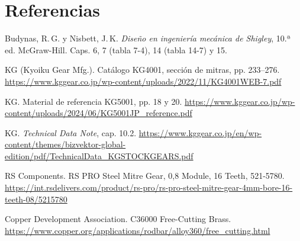 \documentclass[11pt,a4paper]{article}
\begin{document}
\section*{Referencias}
\begin{enumerate}[label={[\arabic*]},leftmargin=2em]
\item Budynas, R.\,G. y Nisbett, J.\,K. \textit{Diseño en ingeniería mecánica de Shigley}, 10.ª ed. McGraw-Hill. Caps. 6, 7 (tabla 7-4), 14 (tabla 14-7) y 15.
\item KG (Kyoiku Gear Mfg.). Catálogo KG4001, sección de mitras, pp. 233--276. \url{https://www.kggear.co.jp/wp-content/uploads/2022/11/KG4001WEB-7.pdf}
\item KG. Material de referencia KG5001, pp. 18 y 20. \url{https://www.kggear.co.jp/wp-content/uploads/2024/06/KG5001JP_reference.pdf}
\item KG. \textit{Technical Data Note}, cap. 10.2. \url{https://www.kggear.co.jp/en/wp-content/themes/bizvektor-global-edition/pdf/TechnicalData_KGSTOCKGEARS.pdf}
\item RS Components. RS PRO Steel Mitre Gear, 0,8 Module, 16 Teeth, 521-5780. \url{https://int.rsdelivers.com/product/rs-pro/rs-pro-steel-mitre-gear-4mm-bore-16-teeth-08/5215780}
\item Copper Development Association. C36000 Free-Cutting Brass. \url{https://www.copper.org/applications/rodbar/alloy360/free_cutting.html}
\end{enumerate}
\end{document}
